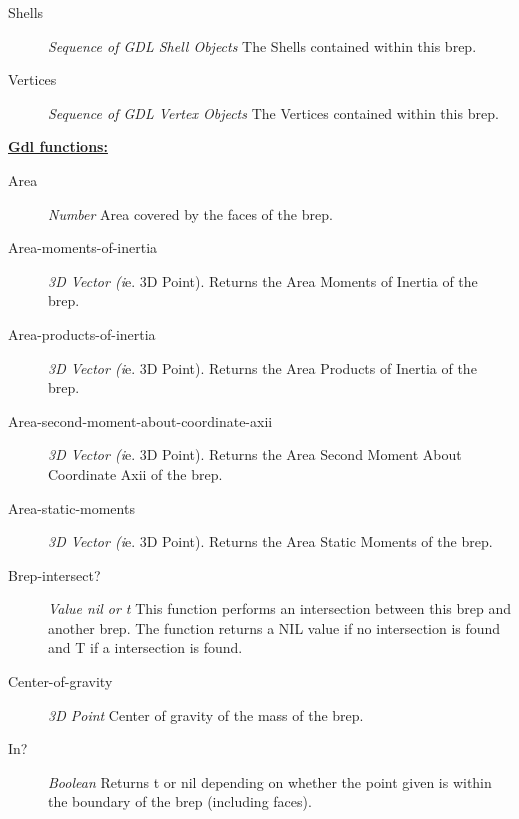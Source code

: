 \documentclass [11pt]{book}
\begin{document}
\begin{itemize}
\begin{description}
\item [Shells]
\emph{Sequence of GDL Shell Objects} The Shells contained within this brep.


\item [Vertices]
\emph{Sequence of GDL Vertex Objects} The Vertices contained within this brep.


\end{description}






\textbf{
\underline{Gdl functions:}}

\begin{description}

\item [Area]
\emph{Number} Area covered by the faces of the brep.


\item [Area-moments-of-inertia]
\emph{3D Vector (i}e. 3D Point). Returns the Area Moments of Inertia of the brep.


\item [Area-products-of-inertia]
\emph{3D Vector (i}e. 3D Point). Returns the Area Products of Inertia of the brep.


\item [Area-second-moment-about-coordinate-axii]
\emph{3D Vector (i}e. 3D Point). Returns the Area Second Moment About Coordinate Axii of the brep.


\item [Area-static-moments]
\emph{3D Vector (i}e. 3D Point). Returns the Area Static Moments of the brep.


\item [Brep-intersect?]
\emph{Value nil or t} This function performs an intersection between this brep and another brep.
The function returns a NIL value if no intersection is found and T if a intersection is found.


\item [Center-of-gravity]
\emph{3D Point} Center of gravity of the mass of the brep.


\item [In?]
\emph{Boolean} Returns t or nil depending on whether the point given is within the boundary of the brep (including faces).



\end{description}
\end{itemize}
\end{document}

